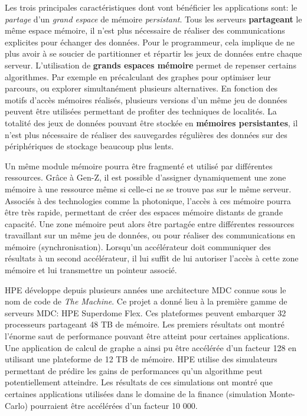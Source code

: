         Les trois principales caractéristiques dont vont bénéficier les applications sont: le \textit{partage} d'un \textit{grand espace} de mémoire \textit{persistant}. 
        Tous les serveurs \textbf{partageant} le même espace mémoire, il n'est plus nécessaire de réaliser des communications explicites pour échanger des données. Pour le programmeur, cela implique de ne plus avoir à se soucier de partitionner et répartir les jeux de données entre chaque serveur. 
        L'utilisation de \textbf{grands espaces mémoire} permet de repenser certains algorithmes. Par exemple en précalculant des graphes pour optimiser leur parcours, ou explorer simultanément plusieurs alternatives. En fonction des motifs d'accès mémoires réalisés, plusieurs versions d'un même jeu de données peuvent être utilisées permettant de profiter des techniques de localités.
        La totalité des jeux de données pouvant être stockée en \textbf{mémoires persistantes}, il n'est plus nécessaire de réaliser des sauvegardes régulières des données sur des périphériques de stockage beaucoup plus lents.

        Un même module mémoire pourra être fragmenté et utilisé par différentes ressources. Grâce à Gen-Z, il est possible d'assigner dynamiquement une zone mémoire à une ressource même si celle-ci ne se trouve pas sur le même serveur.  Associés à des technologies comme la photonique, l'accès à ces mémoire pourra être très rapide, permettant de créer des espaces mémoire distants de grande capacité. Une zone mémoire peut alors être partagée entre différentes ressources travaillant sur un même jeu de données, ou pour réaliser des communications en mémoire (synchronisation). Lorsqu'un accélérateur doit communiquer des résultats à un second accélérateur, il lui suffit de lui autoriser l'accès à cette zone mémoire et lui transmettre un pointeur associé.
           
         HPE développe depuis plusieurs années une architecture MDC connue sous le nom de code de \textit{The Machine}. Ce projet a donné lieu à la première gamme de serveurs MDC: HPE Superdome Flex. Ces plateformes peuvent embarquer 32 processeurs partageant 48 TB de mémoire. Les premiers résultats ont montré l'énorme saut de performance pouvant être atteint pour certaines applications. Une application de calcul de graphe \cite{Chen2016a} a ainsi pu être accélérée d'un facteur 128 en utilisant une plateforme de 12 TB de mémoire. HPE utilise des simulateurs permettant de prédire les gains de performances qu'un algorithme peut potentiellement atteindre. Les résultats de ces simulations ont montré que certaines applications utilisées dans le domaine de la finance (simulation Monte-Carlo) pourraient être accélérées d'un facteur 10 000.
   
